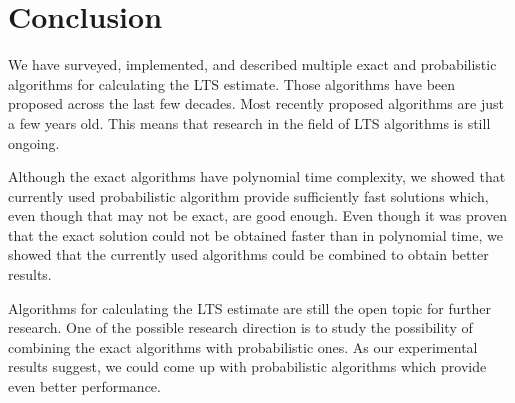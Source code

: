 
\chapter{Conclusion}
We have surveyed, implemented, and described multiple exact and probabilistic algorithms for calculating the LTS estimate. 
Those algorithms have been proposed across the last few decades. Most recently proposed algorithms are just a few years old. This means that research in the field of LTS algorithms is still ongoing.

Although the exact algorithms have polynomial time complexity, we showed that currently used probabilistic algorithm provide sufficiently fast solutions which, even though that may not be exact, are good enough. Even though it was proven that the exact solution could not be obtained faster than in polynomial time, we showed that the currently used algorithms could be combined to obtain better results.

Algorithms for calculating the LTS estimate are still the open topic for further research. One of the possible research direction is to study the possibility of combining the exact algorithms with probabilistic ones. As our experimental results suggest, we could come up with probabilistic algorithms which provide even better performance.